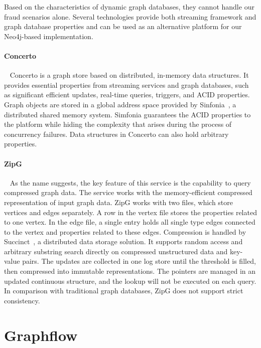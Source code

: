 Based on the characteristics of dynamic graph databases, they cannot handle our fraud scenarios alone. 
Several technologies provide both streaming framework and graph database properties and can be used as an alternative platform for our Neo4j-based implementation.

\paragraph{Concerto}~\cite{10.1007/978-3-642-45065-5_15}
Concerto is a graph store based on distributed, in-memory data structures.
It provides essential properties from streaming services and graph databases, such as significant efficient updates, real-time queries, triggers, and ACID properties.
Graph objects are stored in a global address space provided by Sinfonia~\cite{DBLP:journals/tocs/AguileraMSVK09}, a distributed shared memory system.
Simfonia guarantees the ACID properties to the platform while hiding the complexity that arises during the process of concurrency failures.
Data structures in Concerto can also hold arbitrary properties.

\paragraph{ZipG}~\cite{DBLP:conf/sigmod/KhandelwalYY0S17}
As the name suggests, the key feature of this service is the capability to query compressed graph data.
The service works with the memory-efficient compressed representation of input graph data.
ZipG works with two files, which store vertices and edges separately.
A row in the vertex file stores the properties related to one vertex.
In the edge file, a single entry holds all single type edges connected to the vertex and properties related to these edges.
Compression is handled by Succinct~\cite{DBLP:conf/nsdi/AgarwalKS15}, a distributed data storage solution.
It supports random access and arbitrary substring search directly on compressed unstructured data and key-value pairs.
The updates are collected in one log store until the threshold is filled, then compressed into immutable representations.
The pointers are managed in an updated continuous structure, and the lookup will not be executed on each query.
In comparison with traditional graph databases, ZipG does not support strict consistency.

\section{Graphflow}

